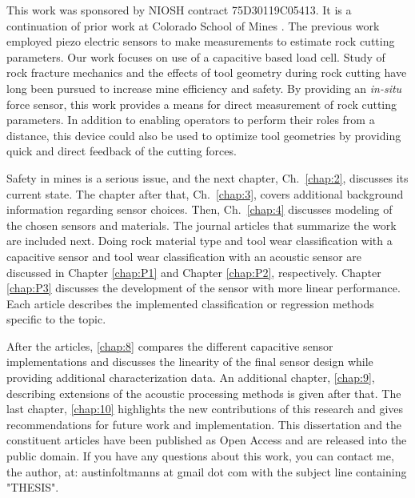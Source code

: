 This work was sponsored by NIOSH contract 75D30119C05413.
It is a continuation of prior work at Colorado School of Mines \cite{11124/170545}.
The previous work employed piezo electric sensors to make measurements to estimate
rock cutting parameters. 
Our work focuses on use of a capacitive based load cell.
Study of rock fracture mechanics \cite{11124/14359} 
and the effects of tool geometry during rock cutting \cite{11124/13192, 11124/16423, 11124/176345} 
have long been pursued to increase mine efficiency and safety.
By providing an \textit{in-situ} force sensor, this work provides a means
for direct measurement of rock cutting parameters.
In addition to enabling operators to perform their roles from a distance,
this device could also be used to optimize tool geometries 
by providing quick and direct feedback of the cutting forces.

Safety in mines is a serious issue, and the next chapter, Ch.~\ref{chap:2}, discusses its current state.
The chapter after that, Ch.~\ref{chap:3}, covers additional background information regarding sensor choices.
Then, Ch.~\ref{chap:4} discusses modeling of the chosen sensors and materials.
The journal articles that summarize the work are included next. 
Doing rock material type and tool wear classification with a capacitive sensor and 
tool wear classification with an acoustic sensor
are discussed in Chapter \ref{chap:P1} and Chapter \ref{chap:P2}, respectively.
Chapter \ref{chap:P3} discusses the development of the sensor with more linear performance.
Each article describes the implemented classification or regression methods specific to the topic.

After the articles, \ref{chap:8} compares the different capacitive sensor implementations
and discusses the linearity of the final sensor design while providing additional characterization data.
An additional chapter, \ref{chap:9}, describing extensions of the acoustic processing methods is given after that.
The last chapter, \ref{chap:10} highlights the new contributions of this research and gives recommendations 
for future work and implementation.
This dissertation and the constituent articles have been published as 
Open Access and are released into the public domain.
If you have any questions about this work, you can contact me, the author, at:
austinfoltmanns at gmail dot com with the subject line containing "THESIS".

